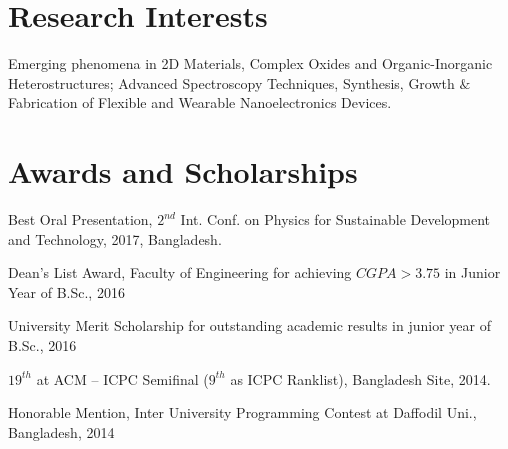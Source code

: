 \documentclass[a4paper,20pt]{article}
\begin{document}
	 
\vspace{0pt}
\section{Research Interests}
	Emerging phenomena in 2D Materials, Complex Oxides and Organic-Inorganic Heterostructures; Advanced Spectroscopy Techniques, Synthesis, Growth $\&$ Fabrication of Flexible and Wearable Nanoelectronics Devices.\\

\vspace{0pt}
\section{Awards and Scholarships}
	\begin{description}[font=$\bullet$]
		\item{Best Oral Presentation, $2^{nd}$ Int. Conf. on Physics for Sustainable Development and Technology, 2017, Bangladesh.}
		\vspace{-5pt}
		\item {Dean's List Award, Faculty of Engineering for achieving $CGPA>3.75$ in Junior Year of B.Sc., 2016}
		\vspace{-5pt}
		\item {University Merit Scholarship for outstanding academic results in junior year of B.Sc., 2016}
		\vspace{-5pt}
		\item {$19^{th}$ at ACM – ICPC Semifinal ($9^{th}$ as ICPC Ranklist), Bangladesh Site, 2014.}
		\vspace{-5pt}
		\item {Honorable Mention, Inter University Programming Contest at Daffodil Uni., Bangladesh, 2014}
		
\end{description}
\end{document}
